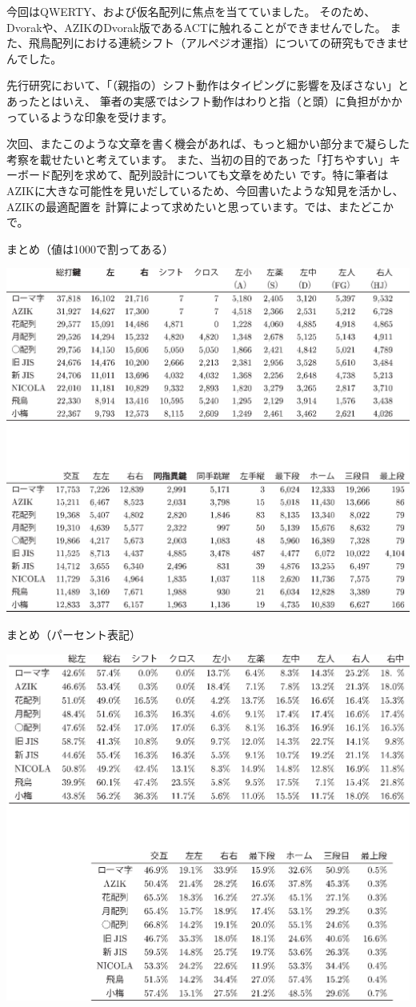 今回はQWERTY、および仮名配列に焦点を当てていました。
そのため、Dvorakや、AZIKのDvorak版であるACTに触れることができませんでした。
また、飛鳥配列における連続シフト（アルペジオ運指）についての研究もできませんでした。

先行研究において、「（親指の）シフト動作はタイピングに影響を及ぼさない」とあったとはいえ、
筆者の実感ではシフト動作はわりと指（と頭）に負担がかかっているような印象を受けます。

次回、またこのような文章を書く機会があれば、もっと細かい部分まで凝らした考察を載せたいと考えています。
また、当初の目的であった「打ちやすい」キーボード配列を求めて、配列設計についても文章をめたい
です。特に筆者はAZIKに大きな可能性を見いだしているため、今回書いたような知見を活かし、AZIKの最適配置を
計算によって求めたいと思っています。では、またどこかで。

\clearpage

\begin{table}[htbp]
 \caption{まとめ（値は1000で割ってある）}
 \begin{center}
  \includegraphics[angle=90, width=0.85\hsize]{matome-table.eps}
 \end{center}
 \label{tbl:matome}
\end{table}

\clearpage

\begin{table}[htbp]
 \caption{まとめ（パーセント表記）}
 \begin{center}
  \includegraphics[angle=90, width=0.85\hsize]{matome-table-percent.eps}
 \end{center}
 \label{tbl:matome-percent}
\end{table}

